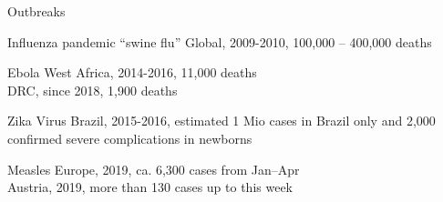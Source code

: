 \documentclass[table]{beamer}\usepackage[]{graphicx}\usepackage[]{color}
\begin{document}
{
%
%
\begin{frame}[fragile]{Outbreaks}

\begin{block} {Influenza pandemic ``swine flu''}
Global, 2009-2010, 100,000 -- 400,000 deaths
\end{block}
\begin{block} {Ebola}
West Africa, 2014-2016, 11,000 deaths \\
DRC, since 2018, 1,900 deaths
\end{block}
\begin{block} {Zika Virus}
Brazil, 2015-2016, estimated 1 Mio cases in Brazil only and 2,000 confirmed severe complications in newborns
\end{block}
\begin{block} {Measles}
Europe, 2019, ca. 6,300 cases from Jan--Apr \\ %
Austria, 2019, more than 130 cases up to this week
\end{block}

\end{frame}
}
\end{document}
